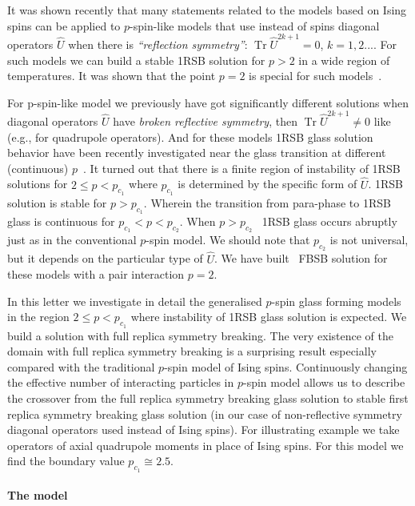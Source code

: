 \documentclass{jetpl}
\DeclareMathOperator{\Tr}{Tr}
\begin{document}
It was shown recently that many statements related to the models based on Ising spins can be applied to $p$-spin-like models that use instead of spins diagonal operators $\hat{U}$ when there is \textit{``reflection symmetry''}: $\Tr\hat{U}^{2k+1} =0$, $k=1,2...$. For such models we can build a stable 1RSB solution for $p>2$ in a wide region of temperatures. It was shown that the point $p = 2$ is special  for such models~\cite{JPA,schelk,Full}.

For p-spin-like model we previously have got significantly different solutions when diagonal operators $\hat{U}$ have \textit{broken reflective symmetry}, then $\Tr\hat{U}^{2k+1} \neq 0$ like (e.g., for quadrupole operators). And for these models 1RSB glass solution behavior have been recently investigated near the glass transition at different (continuous) $p$~\cite{JPA,EShch}. It turned out that there is a finite region of instability of 1RSB solutions for $2\leq p<p_{c_{1}}$ where $p_{c_{1}}$ is determined by the specific form of $\hat{U}$. 1RSB solution is stable for $p>p_{c_{1}}$. Wherein the transition from para-phase to 1RSB glass  is continuous for $p_{c_{1}}< p<p_{c_{2}}$. When $p>p_{c_{2}}$~\cite{JPA,EShch} 1RSB glass occurs abruptly just as in the conventional $p$-spin model. We should note that $p_{c_{2}}$ is not universal, but it depends on the particular  type of $\hat{U}$. We have built~\cite{sche,schel} FBSB solution for these models with a pair interaction $p=2$.

In this letter  we  investigate in detail the generalised $p$-spin glass forming models in the region $2\leq p<p_{c_{1}}$ where  instability of 1RSB glass solution is expected. We build a solution with full replica symmetry breaking.  The very existence of the domain with full replica symmetry breaking is a surprising result especially compared with the traditional $p$-spin model of Ising spins. Continuously changing the effective number of interacting particles in $p$-spin model allows us to describe the crossover from the full replica symmetry breaking glass solution to stable first replica symmetry breaking glass solution (in our case of  non-reflective symmetry diagonal operators used instead of Ising spins).  For illustrating example we take operators of axial quadrupole moments in place of Ising spins. For this model  we find the boundary value $p_{c_{1}}\cong 2.5$.

\paragraph*{The model\label{secmodel}}
\end{document}
